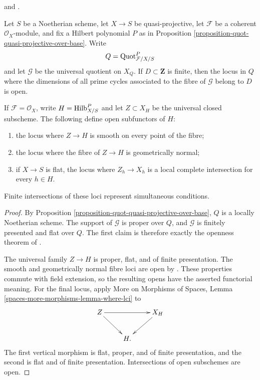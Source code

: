 \begin{proposition}
\label{proposition-quot-open-fibre-conditions}
\begin{reference}
\cite[Expos\'e 221, Section 4(b), p. 267]{FGA} and
\cite[Chapter IV, Theorems 12.2.1 and 12.2.4]{EGA4}.
\end{reference}
Let $S$ be a Noetherian scheme, let $X \to S$ be quasi-projective, let
$\mathcal{F}$ be a coherent $\mathcal{O}_X$-module, and fix a Hilbert
polynomial $P$ as in Proposition
\ref{proposition-quot-quasi-projective-over-base}. Write
$$
Q = \mathrm{Quot}^P_{\mathcal{F}/X/S}
$$
and let $\mathcal{G}$ be the universal quotient on $X_Q$. If
$D \subset \mathbf{Z}$ is finite, then the locus in $Q$ where the
dimensions of all prime cycles associated to the fibre of $\mathcal{G}$
belong to $D$ is open.

If $\mathcal{F} = \mathcal{O}_X$, write $H = \mathrm{Hilb}^P_{X/S}$ and
let $Z \subset X_H$ be the universal closed subscheme. The following define
open subfunctors of $H$:
\begin{enumerate}
\item the locus where $Z \to H$ is smooth on every point of the fibre;
\item the locus where the fibre of $Z \to H$ is geometrically normal;
\item if $X \to S$ is flat, the locus where
$Z_h \to X_h$ is a local complete intersection for every $h \in H$.
\end{enumerate}
Finite intersections of these loci represent simultaneous conditions.
\end{proposition}

\begin{proof}
By Proposition \ref{proposition-quot-quasi-projective-over-base}, $Q$ is a
locally Noetherian scheme. The support of $\mathcal{G}$ is proper over $Q$,
and $\mathcal{G}$ is finitely presented and flat over $Q$. The first claim
is therefore exactly the openness theorem of
\cite[Chapter IV, Theorem 12.2.1(i)]{EGA4}.

The universal family $Z \to H$ is proper, flat, and of finite presentation.
The smooth and geometrically normal fibre loci are open by
\cite[Chapter IV, Theorem 12.2.4(iii), (iv)]{EGA4}. These properties commute
with field extension, so the resulting opens have the asserted functorial
meaning. For the final locus, apply More on Morphisms of Spaces, Lemma
\ref{spaces-more-morphisms-lemma-where-lci} to
$$
\xymatrix{
Z \ar[rr] \ar[rd] & & X_H \ar[ld] \\
& H.
}
$$
The first vertical morphism is flat, proper, and of finite presentation,
and the second is flat and of finite presentation. Intersections of open
subschemes are open.
\end{proof}

